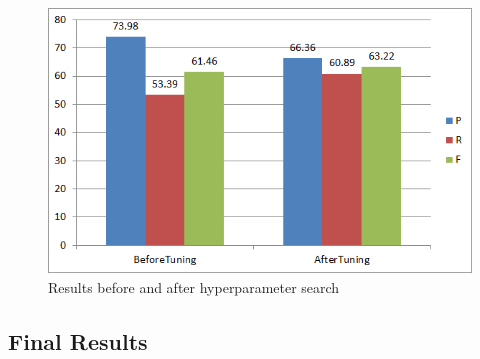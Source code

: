 \begin{figure}
\centering
\includegraphics[scale=0.6]{figures/SSModelRegPar.png}
\caption{Results before and after hyperparameter search}\label{fig:SSModelRegPar}
\end{figure}

\subsection{Final Results}\label{subsec:SSFinalRes}

